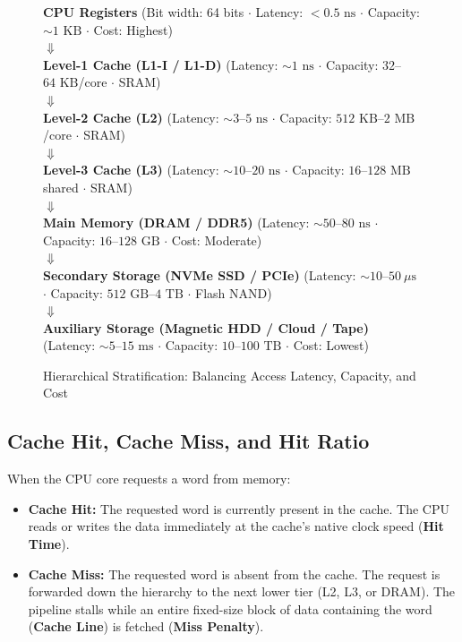 \begin{figure}[htbp]
\centering
\small
\begin{tcolorbox}[colback=blue!5!white,colframe=blue!75!black,title=\textbf{The Classical Computer Memory Hierarchy Pyramid}]
\centering
\textbf{CPU Registers} (Bit width: 64 bits $\cdot$ Latency: $<0.5\text{ ns}$ $\cdot$ Capacity: $\sim 1\text{ KB}$ $\cdot$ Cost: Highest) \\
$\Downarrow$ \\
\textbf{Level-1 Cache (L1-I / L1-D)} (Latency: $\sim 1\text{ ns}$ $\cdot$ Capacity: $32$--$64\text{ KB}$/core $\cdot$ SRAM) \\
$\Downarrow$ \\
\textbf{Level-2 Cache (L2)} (Latency: $\sim 3$--$5\text{ ns}$ $\cdot$ Capacity: $512\text{ KB}$--$2\text{ MB}$/core $\cdot$ SRAM) \\
$\Downarrow$ \\
\textbf{Level-3 Cache (L3)} (Latency: $\sim 10$--$20\text{ ns}$ $\cdot$ Capacity: $16$--$128\text{ MB}$ shared $\cdot$ SRAM) \\
$\Downarrow$ \\
\textbf{Main Memory (DRAM / DDR5)} (Latency: $\sim 50$--$80\text{ ns}$ $\cdot$ Capacity: $16$--$128\text{ GB}$ $\cdot$ Cost: Moderate) \\
$\Downarrow$ \\
\textbf{Secondary Storage (NVMe SSD / PCIe)} (Latency: $\sim 10$--$50\ \mu\text{s}$ $\cdot$ Capacity: $512\text{ GB}$--$4\text{ TB}$ $\cdot$ Flash NAND) \\
$\Downarrow$ \\
\textbf{Auxiliary Storage (Magnetic HDD / Cloud / Tape)} (Latency: $\sim 5$--$15\text{ ms}$ $\cdot$ Capacity: $10$--$100\text{ TB}$ $\cdot$ Cost: Lowest)
\end{tcolorbox}
\caption{Hierarchical Stratification: Balancing Access Latency, Capacity, and Cost}
\label{fig:memory_pyramid}
\end{figure}

\subsection{Cache Hit, Cache Miss, and Hit Ratio}
When the CPU core requests a word from memory:
\begin{itemize}
    \item \textbf{Cache Hit:} The requested word is currently present in the cache. The CPU reads or writes the data immediately at the cache's native clock speed (\textbf{Hit Time}).
    \item \textbf{Cache Miss:} The requested word is absent from the cache. The request is forwarded down the hierarchy to the next lower tier (L2, L3, or DRAM). The pipeline stalls while an entire fixed-size block of data containing the word (\textbf{Cache Line}) is fetched (\textbf{Miss Penalty}).
\end{itemize}

